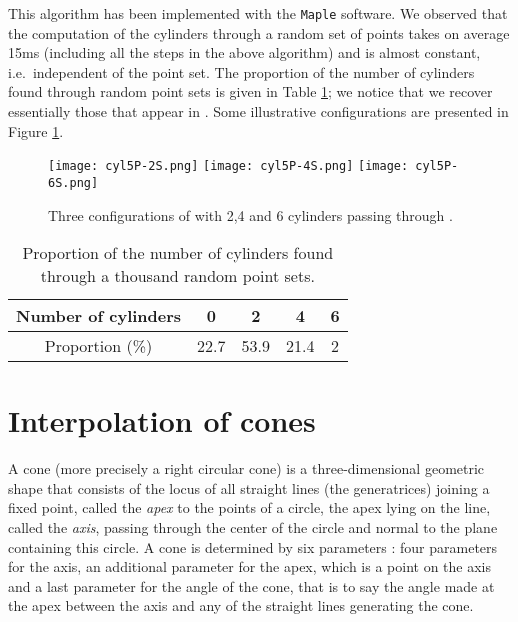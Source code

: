 \documentclass[5p]{elsarticle}
\newcommand{\com}[1]{{\color{black} #1}}
\begin{document}
This algorithm has been implemented with the {\tt Maple} software. We observed that the computation of the cylinders through a random set of points takes \com{on average} 15ms \com{(including all the steps in the above algorithm)} and is almost constant,   \com{i.e.~independent} of the point set. The proportion of the number of cylinders found through random point sets is given in Table \ref{tab:cylinders5P}; \com{we notice that we recover essentially those that appear in \cite[\S 4.1]{Lichtblau12}}. Some illustrative configurations are presented in Figure \ref{fig:cyl5P}.

\begin{figure}[ht!]
\centering	
   \texttt{[image: cyl5P-2S.png]}
   \hspace{4em}
   \texttt{[image: cyl5P-4S.png]}
   \hspace{4em}
   \texttt{[image: cyl5P-6S.png]}
   \caption{Three configurations of  with 2,4 and 6 cylinders passing through .}\label{fig:cyl5P}
\end{figure}  
    
	
\begin{table}[ht!]
\begin{center}
\begin{tabular}{c|c|c|c|c|}
 Number of cylinders & 0 & 2 & 4 & 6 \\ 
	 \hline
Proportion (\%)	 &  22.7 & 53.9 & 21.4 & 2 \\
\hline	
\end{tabular}
\caption{Proportion of the number of cylinders found through a thousand random point sets.}\label{tab:cylinders5P}
\end{center}
\end{table}


\section{Interpolation of cones}	

A cone (more precisely a right circular cone) is a three-dimensional geometric shape that consists of the locus of all straight lines (the generatrices) joining a fixed point, called the \emph{apex} to the points of a circle, the apex lying on the line, called the \emph{axis}, passing through the center of the circle and normal to the plane containing this circle. A cone is determined by six parameters : four parameters for the axis, an additional parameter for the apex, which is a point on the axis and a last parameter for the angle of the cone, that is to say the angle made at the apex between the axis and any of the straight lines generating the cone.  
\end{document}
